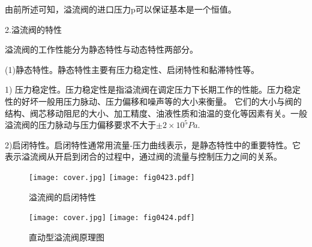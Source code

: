 \par 由前所述可知，溢流阀的进口压力p可以保证基本是一个恒值。
\par 2.溢流阀的特性
\par 溢流阀的工作性能分为静态特性与动态特性两部分。
\par (1)静态特性。静态特性主要有压力稳定性、启闭特性和黏滞特性等。
\par 1) 压力稳定性。压力稳定性是指溢流阀在调定压力下长期工作的性能。压力稳定性的好坏一般用压力脉动、压力偏移和噪声等的大小来衡量。
它们的大小与阀的结构、阀芯移动阻尼的大小、加工精度、油液性质和油温的变化等因素有关。一般溢流阀的压力脉动与压力偏移要求不大于$\pm2×10^5Pa$.
\par 2)启闭特性。启闭特性通常用流量-压力曲线表示，是静态特性中的重要特性。它表示溢流阀从开启到闭合的过程中，通过阀的流量与控制压力之间的关系。
\begin{figure}
   \centering
    \ifOpenSource  
    \texttt{[image: cover.jpg]}
    \else
   \texttt{[image: fig0423.pdf]}
   \fi
   \caption{溢流阀的启闭特性}
   \label{fig:fig0423}
 \end{figure}

 \begin{figure}
   \centering
    \ifOpenSource  
    \texttt{[image: cover.jpg]}
    \else
   \texttt{[image: fig0424.pdf]}
   \fi
   \caption{直动型溢流阀原理图}
   \label{fig:fig0424}
   \end{figure}


